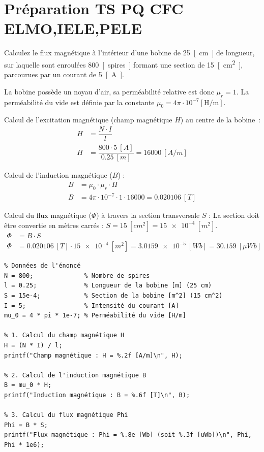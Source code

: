 \documentclass[a4paper,12pt,answers,addpoints]{exam}
\begin{document}
	\unframedsolutions
	\pointsinmargin
	\bracketedpoints
	
\section*{Préparation TS PQ CFC ELMO,IELE,PELE}
\begin{questions}
\question[6] Calculez le flux magnétique à l'intérieur d'une bobine de \qty{25}{[cm]} de longueur, sur laquelle sont enroulées \qty{800}{[spires]} formant une section de \qty{15}{[cm^2]}, parcourues par un courant de \qty{5}{[A]}.

\begin{solution}
La bobine possède un noyau d'air, sa perméabilité relative est donc $\mu_r = 1$. La perméabilité du vide est définie par la constante $\mu_0 = 4\pi \cdot 10^{-7}{[\text{H/m}]}$.

Calcul de l'excitation magnétique (champ magnétique $H$) au centre de la bobine~:
\begin{align*}
H &= \dfrac{N \cdot I}{l} \\[6pt]
H &= \dfrac{800 \cdot \qty{5}{[A]}}{\qty{0,25}{[m]}} = \qty{16000}{[A/m]}
\end{align*}

Calcul de l'induction magnétique ($B$) :
\begin{align*}
B &= \mu_0 \cdot \mu_r \cdot H \\[6pt]
B &= 4\pi \cdot 10^{-7} \cdot 1 \cdot 16000 = \qty{0,020106}{[T]}
\end{align*}

Calcul du flux magnétique ($\Phi$) à travers la section transversale $S$ :
La section doit être convertie en mètres carrés : $S = \qty{15}{[cm^2]} = \qty{15e-4}{[m^2]}$.
\begin{align*}
\Phi &= B \cdot S \\[6pt]
\Phi &= \qty{0,020106}{[T]} \cdot \qty{15e-4}{[m^2]} = \qty{3,0159e-5}{[Wb]} = \qty{30,159}{[\mu Wb]}
\end{align*}

\begin{verbatim}
% Données de l'énoncé
N = 800;              % Nombre de spires
l = 0.25;             % Longueur de la bobine [m] (25 cm)
S = 15e-4;            % Section de la bobine [m^2] (15 cm^2)
I = 5;                % Intensité du courant [A]
mu_0 = 4 * pi * 1e-7; % Perméabilité du vide [H/m]

% 1. Calcul du champ magnétique H
H = (N * I) / l;
printf("Champ magnétique : H = %.2f [A/m]\n", H);

% 2. Calcul de l'induction magnétique B
B = mu_0 * H;
printf("Induction magnétique : B = %.6f [T]\n", B);

% 3. Calcul du flux magnétique Phi
Phi = B * S;
printf("Flux magnétique : Phi = %.8e [Wb] (soit %.3f [uWb])\n", Phi, Phi * 1e6);
\end{verbatim}
\end{solution}
\end{questions}
\end{document}
